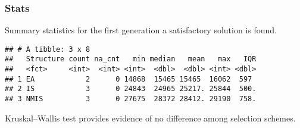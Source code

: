 \documentclass[]{book}
\newenvironment{Shaded}{\begin{snugshade}}{\end{snugshade}}
\newcommand{\CharTok}[1]{\textcolor[rgb]{0.31,0.60,0.02}{#1}}
\newcommand{\DataTypeTok}[1]{\textcolor[rgb]{0.13,0.29,0.53}{#1}}
\newcommand{\DecValTok}[1]{\textcolor[rgb]{0.00,0.00,0.81}{#1}}
\newcommand{\KeywordTok}[1]{\textcolor[rgb]{0.13,0.29,0.53}{\textbf{#1}}}
\newcommand{\NormalTok}[1]{#1}
\newcommand{\OperatorTok}[1]{\textcolor[rgb]{0.81,0.36,0.00}{\textbf{#1}}}
\newcommand{\OtherTok}[1]{\textcolor[rgb]{0.56,0.35,0.01}{#1}}
\newcommand{\StringTok}[1]{\textcolor[rgb]{0.31,0.60,0.02}{#1}}
\begin{document}
\hypertarget{stats-47}{%
\subsubsection{Stats}\label{stats-47}}

Summary statistics for the first generation a satisfactory solution is found.

\begin{Shaded}
\end{Shaded}

\begin{verbatim}
## # A tibble: 3 x 8
##   Structure count na_cnt   min median   mean   max   IQR
##   <fct>     <int>  <int> <int>  <dbl>  <dbl> <int> <dbl>
## 1 EA            2      0 14868  15465 15465  16062  597 
## 2 IS            3      0 24843  24965 25217. 25844  500.
## 3 NMIS          3      0 27675  28372 28412. 29190  758.
\end{verbatim}

Kruskal--Wallis test provides evidence of no difference among selection schemes.
\end{document}
